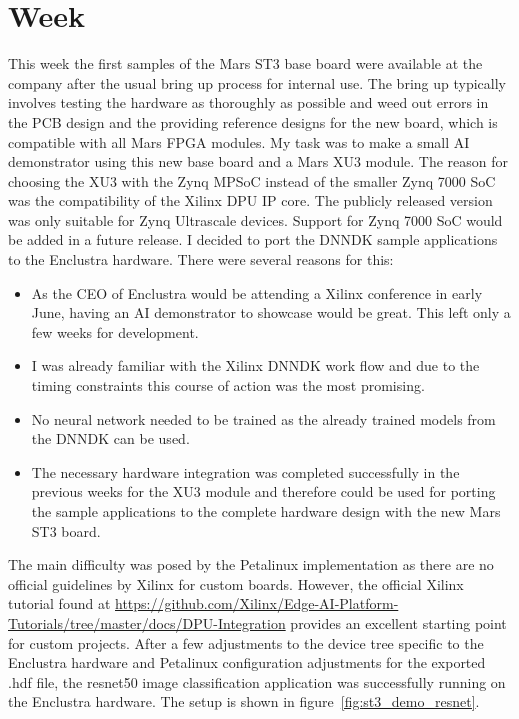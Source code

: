 \chapter{Week}
This week the first samples of the Mars ST3 base board were available at the company after the usual bring up process for internal use. The bring up typically involves testing the hardware as thoroughly as possible and weed out errors in the \ac{PCB} design and the providing reference designs for the new board, which is compatible with all Mars \ac{FPGA} modules. My task was to make a small \ac{AI} demonstrator using this new base board and a Mars XU3 module. The reason for choosing the XU3 with the Zynq \ac{MPSoC} instead of the smaller Zynq 7000 \ac{SoC} was the compatibility of the Xilinx \ac{DPU} \ac{IP} core. The publicly released version was only suitable for Zynq Ultrascale devices. Support for Zynq 7000 \ac{SoC} would be added in a future release. I decided to port the \ac{DNNDK} sample applications to the Enclustra hardware. There were several reasons for this:
\begin{itemize}
	\item As the CEO of Enclustra would be attending a Xilinx conference in early June, having an \ac{AI} demonstrator to showcase would be great. This left only a few weeks for development.
	\item I was already familiar with the Xilinx \ac{DNNDK} work flow and due to the timing constraints this course of action was the most promising.
	\item No neural network needed to be trained as the already trained models from the \ac{DNNDK} can be used.
	\item The necessary hardware integration was completed successfully in the previous weeks for the XU3 module and therefore could be used for porting the sample applications to the complete hardware design with the new Mars ST3 board.
\end{itemize}
The main difficulty was posed by the Petalinux implementation as there are no official guidelines by Xilinx for custom boards. However, the official Xilinx tutorial found at \href{https://github.com/Xilinx/Edge-AI-Platform-Tutorials/tree/master/docs/DPU-Integration}{https://github.com/Xilinx/Edge-AI-Platform-Tutorials/tree/master/docs/DPU-Integration} provides an excellent starting point for custom projects. After a few adjustments to the device tree specific to the Enclustra hardware and Petalinux configuration adjustments for the exported .hdf file, the resnet50 image classification application was successfully running on the Enclustra hardware. The setup is shown in figure~\ref{fig:st3_demo_resnet}.

